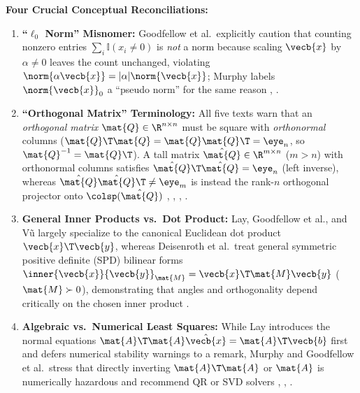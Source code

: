 \documentclass[../../../../master.tex]{subfiles}
\begin{document}
\begin{crossbook}
\textbf{Four Crucial Conceptual Reconciliations:}
\begin{enumerate}[leftmargin=1.4em]
  \item \textbf{``$\ell_0$ Norm'' Misnomer:} Goodfellow et al.\ explicitly caution that counting nonzero entries $\sum_i \mathbb{I}(x_i \neq 0)$ is \emph{not} a norm because scaling $\vecb{x}$ by $\alpha \neq 0$ leaves the count unchanged, violating $\norm{\alpha\vecb{x}} = |\alpha|\norm{\vecb{x}}$; Murphy labels $\norm{\vecb{x}}_0$ a ``pseudo norm'' for the same reason , .
  \item \textbf{``Orthogonal Matrix'' Terminology:} All five texts warn that an \emph{orthogonal matrix} $\mat{Q} \in \R^{n \times n}$ must be square with \emph{orthonormal} columns ($\mat{Q}\T\mat{Q} = \mat{Q}\mat{Q}\T = \eye_n$, so $\mat{Q}^{-1} = \mat{Q}\T$). A tall matrix $\hat{\mat{Q}} \in \R^{m \times n}$ ($m > n$) with orthonormal columns satisfies $\hat{\mat{Q}}\T\hat{\mat{Q}} = \eye_n$ (left inverse), whereas $\hat{\mat{Q}}\hat{\mat{Q}}\T \neq \eye_m$ is instead the rank-$n$ orthogonal projector onto $\colsp(\hat{\mat{Q}})$ , , , .
  \item \textbf{General Inner Products vs.\ Dot Product:} Lay, Goodfellow et al., and V\~{u} largely specialize to the canonical Euclidean dot product $\vecb{x}\T\vecb{y}$, whereas Deisenroth et al.\ treat general symmetric positive definite (SPD) bilinear forms $\inner{\vecb{x}}{\vecb{y}}_{\mat{M}} = \vecb{x}\T\mat{M}\vecb{y}$ ($\mat{M} \succ 0$), demonstrating that angles and orthogonality depend critically on the chosen inner product .
  \item \textbf{Algebraic vs.\ Numerical Least Squares:} While Lay introduces the normal equations $\mat{A}\T\mat{A}\hat{\vecb{x}} = \mat{A}\T\vecb{b}$ first and defers numerical stability warnings to a remark, Murphy and Goodfellow et al.\ stress that directly inverting $\mat{A}\T\mat{A}$ or $\mat{A}$ is numerically hazardous and recommend QR or SVD solvers , , .
\end{enumerate}
\end{crossbook}
\end{document}
